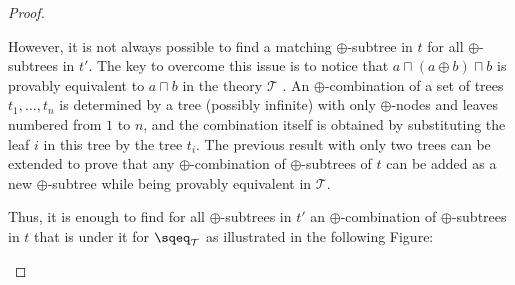 \begin{proof}
    \begin{center}
    \end{center}
    
    However, it is not always possible to find a matching $\oplus$-subtree 
    in $t$ for all $\oplus$-subtrees in $t'$. The key to overcome this 
    issue is to notice  that $a \sqcap (a \oplus b)
    \sqcap b$ is provably equivalent to $a \sqcap b$ in the theory
    $\mathcal{T}$ \cite{mislove2004axioms}. 
    An $\oplus$-combination of a set of trees $t_1, \dots, t_n$
    is determined by a tree (possibly infinite) 
    with only $\oplus$-nodes and leaves numbered from $1$ to $n$,
    and the combination itself is obtained by substituting the leaf $i$
    in this tree by the tree $t_i$.
    The previous result with only two trees can be extended to prove that any
    $\oplus$-combination
    of $\oplus$-subtrees of $t$ can be added as a new
    $\oplus$-subtree while being provably equivalent in $\mathcal{T}$.



    Thus, it is enough to find for all $\oplus$-subtrees in $t'$ an 
    $\oplus$-combination of $\oplus$-subtrees in $t$ that is 
    under it for $\sqeq_\mathcal{T}$ as illustrated in the following 
    Figure:

    \begin{center}
\end{center}
\end{proof}
